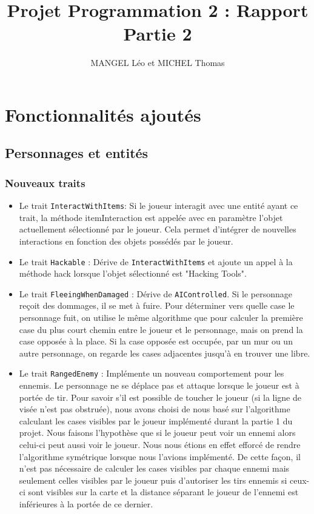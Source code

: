 \documentclass[10pt,a4paper]{article}
\title{Projet Programmation 2 : Rapport Partie 2}
\author{MANGEL Léo et MICHEL Thomas}
\date{}
\begin{document}
\maketitle

\section{Fonctionnalités ajoutés}

\subsection{Personnages et entités}
\subsubsection{Nouveaux traits}
\begin{itemize}
    \item Le trait \texttt{InteractWithItems}: Si le joueur interagit avec une entité ayant ce trait, la méthode itemInteraction est appelée avec en paramètre l'objet actuellement sélectionné par le joueur. Cela permet d'intégrer de nouvelles interactions en fonction des objets possédés par le joueur.
    \item Le trait \texttt{Hackable} : Dérive de \texttt{InteractWithItems} et ajoute un appel à la méthode hack lorsque l'objet sélectionné est "Hacking Tools".
    \item Le trait \texttt{FleeingWhenDamaged} : Dérive de \texttt{AIControlled}. Si le personnage reçoit des dommages, il se met à fuire. Pour déterminer vers quelle case le personnage fuit, on utilise le même algorithme que pour calculer la première case du plus court chemin entre le joueur et le personnage, mais on prend la case opposée à la place. Si la case opposée est occupée, par un mur ou un autre personnage, on regarde les cases adjacentes jusqu'à en trouver une libre.
    \item Le trait \texttt{RangedEnemy} : Implémente un nouveau comportement pour les ennemis. Le personnage ne se déplace pas et attaque lorsque le joueur est à portée de tir. Pour savoir s'il est possible de toucher le joueur (si la ligne de visée n'est pas obstruée), nous avons choisi de nous basé sur l'algorithme calculant les cases visibles par le joueur implémenté durant la partie 1 du projet. Nous faisons l'hypothèse que si le joueur peut voir un ennemi alors celui-ci peut aussi voir le joueur. Nous nous étions en effet efforcé de rendre l'algorithme symétrique lorsque nous l'avions implémenté. De cette façon, il n'est pas nécessaire de calculer les cases visibles par chaque ennemi mais seulement celles visibles par le joueur puis d'autoriser les tirs ennemis si ceux-ci sont visibles sur la carte et la distance séparant le joueur de l'ennemi est inférieures à la portée de ce dernier.
\end{itemize}
\end{document}
